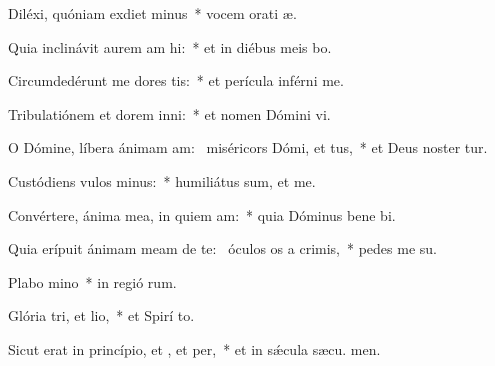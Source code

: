 \item Diléxi, quóniam exdiet minus~* vocem orati æ.
\item Quia inclinávit aurem am hi:~* et in diébus meis bo.
\item Circumdedérunt me dores tis:~* et perícula inférni  me.
\item Tribulatiónem et dorem inni:~* et nomen Dómini vi.
\item O Dómine, líbera ánimam am:~\pscross{} miséricors Dómi, et tus,~* et Deus noster tur.
\item Custódiens vulos minus:~* humiliátus sum, et  me.
\item Convértere, ánima mea, in quiem am:~* quia Dóminus bene bi.
\item Quia erípuit ánimam meam de te:~\pscross{} óculos os a crimis,~* pedes me  su.
\item Plabo mino~* in regió rum.
\item Glória tri, et lio,~* et Spirí to.
\item Sicut erat in princípio, et , et per,~* et in sǽcula sæcu. men.

